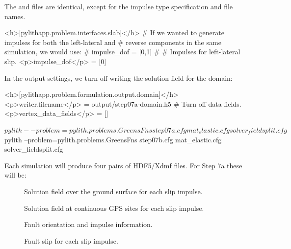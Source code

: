 The  and  files are
identical, except for the impulse type specification and file
names.
\begin{cfg}
<h>[pylithapp.problem.interfaces.slab]</h>
# If we wanted to generate impulses for both the left-lateral and
# reverse components in the same simulation, we would use:
# impulse_dof = [0,1]
#
# Impulses for left-lateral slip.
<p>impulse_dof</p> = [0]
\end{cfg}

In the output settings, we turn off writing the solution field for the
domain:
\begin{cfg}
<h>[pylithapp.problem.formulation.output.domain]</h>
<p>writer.filename</p> = output/step07a-domain.h5
# Turn off data fields.
<p>vertex_data_fields</p> = []
\end{cfg}

\begin{shell}
$ pylith --problem=pylith.problems.GreensFns step07a.cfg mat_elastic.cfg solver_fieldsplit.cfg
$ pylith --problem=pylith.problems.GreensFns step07b.cfg mat_elastic.cfg solver_fieldsplit.cfg
\end{shell}
Each simulation will produce four pairs of HDF5/Xdmf files. For Step
7a these will be:
\begin{description}
\item[] Solution field over the
  ground surface for each slip impulse.
\item[] Solution field at
  continuous GPS sites for each slip impulse.
\item[] Fault orientation
  and impulse information.
\item[] Fault slip for each slip
  impulse.
\end{description}



